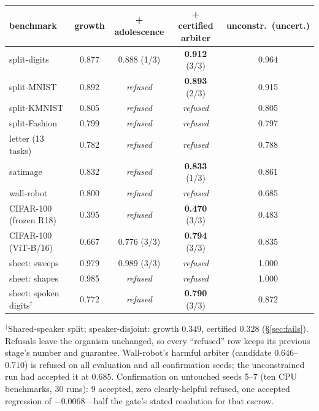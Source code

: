 \documentclass{article}
\begin{document}
\begin{table}[h]
\centering\small
\begin{tabular}{lcccc}
\toprule
benchmark & growth & + adolescence & \textbf{+ certified arbiter} & unconstr.\ (uncert.) \\
\midrule
split-digits & 0.877 & 0.888 (1/3) & \textbf{0.912} (3/3) & 0.964 \\
split-MNIST & 0.892 & \emph{refused} & \textbf{0.893} (2/3) & 0.915 \\
split-KMNIST & 0.805 & \emph{refused} & \emph{refused} & 0.805 \\
split-Fashion & 0.799 & \emph{refused} & \emph{refused} & 0.797 \\
letter (13 tasks) & 0.782 & \emph{refused} & \emph{refused} & 0.788 \\
satimage & 0.832 & \emph{refused} & \textbf{0.833} (1/3) & 0.861 \\
wall-robot & 0.800 & \emph{refused} & \emph{refused} & 0.685 \\
CIFAR-100 (frozen R18) & 0.395 & \emph{refused} & \textbf{0.470} (3/3) & 0.483 \\
CIFAR-100 (ViT-B/16) & 0.667 & 0.776 (3/3) & \textbf{0.794} (3/3) & 0.835 \\
sheet: sweeps & 0.979 & 0.989 (3/3) & \emph{refused} & 1.000 \\
sheet: shapes & 0.985 & \emph{refused} & \emph{refused} & 1.000 \\
sheet: spoken digits$^{\dagger}$ & 0.772 & \emph{refused} & \textbf{0.790} (3/3) & 0.872 \\
\bottomrule
\end{tabular}
\end{table}
$^{\dagger}$Shared-speaker split; speaker-disjoint: growth $0.349$, certified $0.328$
(\S\ref{sec:fails}). Refusals leave the organism unchanged, so every ``refused'' row keeps its
previous stage's number and guarantee. Wall-robot's harmful arbiter
(candidate $0.646$--$0.710$) is refused on all evaluation and all confirmation
seeds; the unconstrained run had accepted it at $0.685$. Confirmation on
untouched seeds 5--7 (ten CPU benchmarks, $30$ runs): $9$ accepted, zero
clearly-helpful refused, one accepted regression of $-0.0068$---half the
gate's stated resolution for that escrow.
\end{document}
